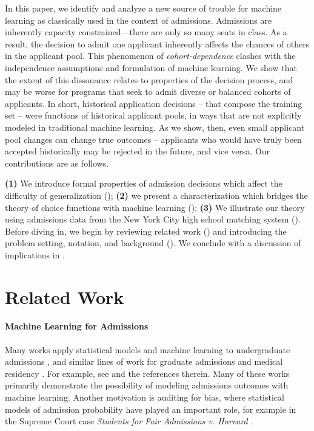 \documentclass[letterpaper]{article}
\begin{document}
In this paper, we identify and analyze a new source of trouble for machine learning as classically used in the context of admissions.
Admissions are inherently capacity constrained---there are only so many seats in class.
As a result, the decision to admit one applicant inherently affects the chances of others in the applicant pool.
This phenomenon of \emph{cohort-dependence} clashes with the independence assumptions and formulation of machine learning.
We show that the extent of this dissonance relates to properties of the decision process, and may be worse for programs that seek to admit diverse or balanced cohorts of applicants. In short, historical application decisions -- that compose the training set -- were functions of historical applicant pools, in ways that are not explicitly modeled in traditional machine learning. As we show, then, even small applicant pool changes can change true outcomes -- applicants who would have truly been accepted historically may be rejected in the future, and vice versa. Our contributions are as follows.

\textbf{(1)}
We introduce formal properties of admission decisions which affect the difficulty of generalization ();
\textbf{(2)} we present a characterization which bridges the theory of choice functions with machine learning ();
\textbf{(3)} We illustrate our theory using admissions data from the New York City high school matching system ().
Before diving in, we begin by reviewing related work () and introducing the problem setting, notation, and background (). We conclude with a discussion of implications in .

\section{Related Work} \label{sec:related-work}

\paragraph{Machine Learning for Admissions}

Many works apply statistical models and machine learning to undergraduate admissions \citep{bruggink1996statistical,lux2016applications,neda2022feasibility,kiaghadi2023university,lee2023augmenting}, and similar lines of work for graduate admissions \citep{moore1998expert,waters2014grade,gupta2016will,staudaher2020predicting} and medical residency \citep{rees2023machine}. For example, see \citet{lee2024ending} and the references therein.
Many of these works primarily demonstrate the possibility of modeling admissions outcomes with machine learning.
Another motivation is auditing for bias, where statistical models of admission probability have played an important role, for example in the Supreme Court case \emph{Students for Fair Admissions v. Harvard}
\citep{sffaamicus}.
\end{document}

